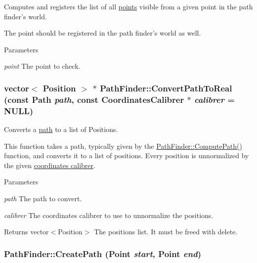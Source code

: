 Computes and registers the list of all \hyperlink{structPathFinder_1_1Point}{points} visible from a given point in the path finder's world. 

The point should be registered in the path finder's world as well.


\begin{DoxyParams}{Parameters}
\item[{\em point}]The point to check. \end{DoxyParams}
\hypertarget{classPathFinder_aba7f833c9bb8de011c62a1f01fb26144}{
\subsubsection[{ConvertPathToReal}]{\setlength{\rightskip}{0pt plus 5cm}vector$<$ Position $>$ $\ast$ PathFinder::ConvertPathToReal (const {\bf Path} {\em path}, \/  const {\bf CoordinatesCalibrer} $\ast$ {\em calibrer} = {\ttfamily NULL})}}
\label{classPathFinder_aba7f833c9bb8de011c62a1f01fb26144}


Converts a \hyperlink{classPathFinder_a269aba09b7b3208092f67f2bc02cf63e}{path} to a list of Positions. 

This function takes a path, typically given by the \hyperlink{classPathFinder_a7d1904c4ee6abc79375356dc64cad995}{PathFinder::ComputePath()} function, and converts it to a list of positions. Every position is unnormalized by the given \hyperlink{classCoordinatesCalibrer}{coordinates calibrer}.


\begin{DoxyParams}{Parameters}
\item[{\em path}]The path to convert. \item[{\em calibrer}]The coordinates calibrer to use to unnormalize the positions. \end{DoxyParams}
\begin{DoxyReturn}{Returns}
vector$<$Position$>$ The positions list. It must be freed with delete. 
\end{DoxyReturn}
\hypertarget{classPathFinder_a42e557e3fe4cd1b209a4722ecfbf876b}{
\subsubsection[{CreatePath}]{ PathFinder::CreatePath ({\bf Point} {\em start}, \/  {\bf Point} {\em end})}}
\label{classPathFinder_a42e557e3fe4cd1b209a4722ecfbf876b}


